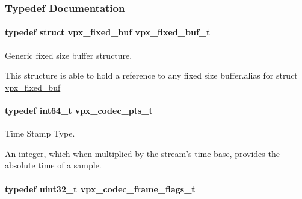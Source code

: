 \subsubsection{Typedef Documentation}
\hypertarget{group__encoder_ga21fab7dd28065f349c97165501223764}{
\paragraph[{vpx\-\_\-fixed\-\_\-buf\-\_\-t}]{\setlength{\rightskip}{0pt plus 5cm}typedef struct {\bf vpx\-\_\-fixed\-\_\-buf}  {\bf vpx\-\_\-fixed\-\_\-buf\-\_\-t}}}\label{group__encoder_ga21fab7dd28065f349c97165501223764}


Generic fixed size buffer structure. 

This structure is able to hold a reference to any fixed size buffer.\-alias for struct \hyperlink{structvpx__fixed__buf}{vpx\-\_\-fixed\-\_\-buf} \hypertarget{group__encoder_ga7e711b0a71c65aef8f0faea8bd57b05f}{
\paragraph[{vpx\-\_\-codec\-\_\-pts\-\_\-t}]{\setlength{\rightskip}{0pt plus 5cm}typedef int64\-\_\-t {\bf vpx\-\_\-codec\-\_\-pts\-\_\-t}}}\label{group__encoder_ga7e711b0a71c65aef8f0faea8bd57b05f}


Time Stamp Type. 

An integer, which when multiplied by the stream's time base, provides the absolute time of a sample. \hypertarget{group__encoder_gaac8ee319b9a6175f6946f59437c7ae4b}{
\paragraph[{vpx\-\_\-codec\-\_\-frame\-\_\-flags\-\_\-t}]{\setlength{\rightskip}{0pt plus 5cm}typedef uint32\-\_\-t {\bf vpx\-\_\-codec\-\_\-frame\-\_\-flags\-\_\-t}}}\label{group__encoder_gaac8ee319b9a6175f6946f59437c7ae4b}


